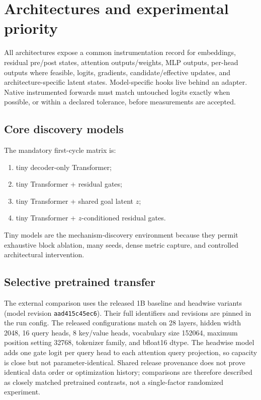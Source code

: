 \documentclass[10pt]{article}
\begin{document}
\section{Architectures and experimental priority}
All architectures expose a common instrumentation record for embeddings, residual pre/post states, attention outputs/weights, MLP outputs, per-head outputs where feasible, logits, gradients, candidate/effective updates, and architecture-specific latent states. Model-specific hooks live behind an adapter. Native instrumented forwards must match untouched logits exactly when possible, or within a declared tolerance, before measurements are accepted.

\subsection{Core discovery models}
The mandatory first-cycle matrix is:
\begin{enumerate}[leftmargin=*]
\item tiny decoder-only Transformer;
\item tiny Transformer + residual gates;
\item tiny Transformer + shared goal latent $z$;
\item tiny Transformer + $z$-conditioned residual gates.
\end{enumerate}
Tiny models are the mechanism-discovery environment because they permit exhaustive block ablation, many seeds, dense metric capture, and controlled architectural intervention.

\subsection{Selective pretrained transfer}
The external comparison uses the released 1B baseline and headwise variants (model revision \texttt{aad415c45ec6}). Their full identifiers and revisions are pinned in the run config. The released configurations match on 28 layers, hidden width 2048, 16 query heads, 8 key/value heads, vocabulary size 152064, maximum position setting 32768, tokenizer family, and bfloat16 dtype. The headwise model adds one gate logit per query head to each attention query projection, so capacity is close but not parameter-identical. Shared release provenance does not prove identical data order or optimization history; comparisons are therefore described as closely matched pretrained contrasts, not a single-factor randomized experiment.
\end{document}
